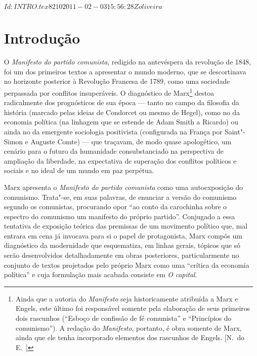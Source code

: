 \SVN $Id: INTRO.tex 8210 2011-02-03 15:56:28Z oliveira $ 
\parskip0pt



\chapter[Introdução, por Ricardo Musse]{Introdução}

O \textit{Manifesto do partido comunista}, redigido na antevéspera da
revolução de 1848, foi um dos primeiros textos a apresentar o mundo
moderno, que se descortinava no horizonte posterior à Revolução
Francesa de 1789, como uma sociedade perpassada por conflitos
insuperáveis. O diagnóstico de Marx\footnote{ Ainda que a autoria do \textit{Manifesto} 
seja historicamente atribuída a Marx e Engels, este último foi responsável somente pela 
elaboração de seus primeiros dois rascunhos (“Esboço de confissão de fé comunista” e “Princípios do comunismo”). 
A redação do \textit{Manifesto}, portanto, é obra somente de Marx, ainda que ele tenha incorporado 
elementos dos rascunhos de Engels. [N.~do E.~]} destoa radicalmente dos
prognósticos de sua época --- tanto no campo da filosofia da história
(marcado pelas ideias de Condorcet ou mesmo de Hegel), como no da
economia política (na linhagem que se estende de Adam Smith a Ricardo)
ou ainda no da emergente sociologia positivista (configurada na França
por Saint"-Simon e Auguste Comte) --- que traçavam, de modo quase
apologético, um cenário para o futuro da humanidade consubstanciado na
perspectiva de ampliação da liberdade, na expectativa de superação dos
conflitos políticos e sociais e no ideal de um mundo em paz perpétua.

Marx apresenta o \textit{Manifesto do partido comunista} como uma
autoexposição do comunismo. Trata"-se, em suas palavras, de
enunciar a versão do comunismo segundo os comunistas, procurando opor
“ao conto da carochinha sobre o espectro do comunismo um manifesto do próprio partido”.
Conjugado a essa tentativa de exposição teórica das premissas de um
movimento político que, mal entrara em cena já invocava para si o papel
de protagonista, Marx compôs um diagnóstico da modernidade que
esquematiza, em linhas gerais, tópicos que só serão desenvolvidos
detalhadamente em obras posteriores, particularmente no conjunto de
textos projetados pelo próprio Marx como uma “crítica da economia
política” e cuja formulação mais acabada consiste em \textit{O
capital}.


